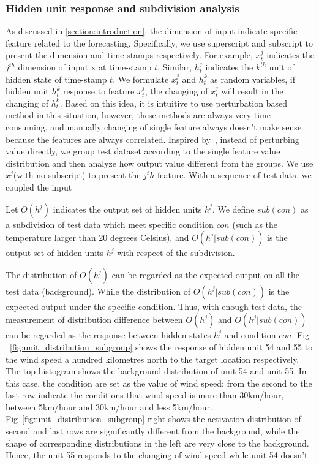\subsubsection{Hidden unit response and subdivision analysis}
\label{section:response_and_activation}
As discussed in \ref{section:introduction}, the dimension of input indicate specific feature related to the forecasting. 
Specifically, we use superscript and subscript to present the dimension and time-stamps respectively. For example, $x_t^{j}$ indicates the $j^{th}$ dimension of input x at time-stamp $t$. Similar, $h_t^{j}$ indicates the $k^{th}$ unit of hidden state of time-stamp $t$. 
We formulate $x_t^j$ and $h_t^k$ as random variables, if hidden unit $h_t^k$ response to feature $x_t^j$, the changing of $x_t^j$ will result in the changing of $h_t^k$. Based on this idea, it is intuitive to use perturbation based method in this situation, however, these methods are always very time-consuming, and manually changing of single feature always doesn't make sense because the features are always correlated. 
Inspired by~\cite{sun2015deeply}, instead of perturbing value directly, we group test dataset according to the single feature value distribution and then analyze how output value different from the groups. 
We use $x^j$(with no subscript) to present the $j^th$ feature. With a sequence of test data, we coupled the input 

Let $O(h^j)$ indicates the output set of hidden units $h^j$. 
We define $sub(con)$ as a subdivision of test data which meet specific condition $con$ (such as the temperature larger than 20 degrees Celsius), and $O(h^j|sub(con))$ is the output set of hidden units $h^j$ with respect of the subdivision. 

The distribution of $O(h^j)$ can be regarded as the expected output on all the test data (background).
While the distribution of $O(h^j|sub(con))$ is the expected output under the specific condition.
Thus, with enough test data, the measurement of distribution difference between $O(h^j)$ and $O(h^j|sub(con))$ can be regarded as the response between hidden states $h^j$ and condition $con$. 
Fig ~\ref{fig:unit_distribution_subgroup} shows the response of hidden unit 54 and 55 to the wind speed a hundred kilometres north to the target location respectively.
The top histogram shows the background distribution of unit 54 and unit 55.
In this case, the condition are set as the value of wind speed: from the second to the last row indicate the conditions that wind speed is more than 30km/hour, between 5km/hour and 30km/hour and less 5km/hour. 
Fig~\ref{fig:unit_distribution_subgroup} right shows the activation distribution of second and last rows are significantly different from the background, while the shape of corresponding distributions in the left are very close to the background. 
Hence, the unit 55 responds to the changing of wind speed while unit 54 doesn't.

